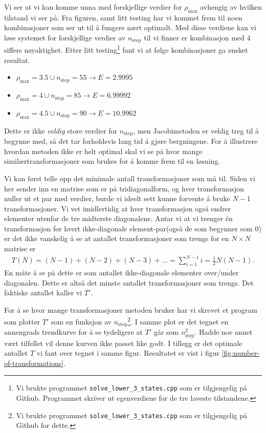 \documentclass[11pt]{article}
\begin{document}
Vi ser at vi kan komme unna med forskjellige verdier for
$\rho_\text{max}$ avhengig av hvilken tilstand vi ser på. Fra figuren,
samt litt testing har vi kommet frem til noen kombinasjoner som ser
ut til å fungere nært optimalt. Med disse verdiene kan vi løse
systemet for forskjellige verdier av $n_\text{step}$ til vi finner er kombinasjon med 4 siffers
nøyaktighet. Etter litt testing\footnote{Vi brukte programmet
  \texttt{solve\_lower\_3\_states.cpp} som er tilgjengelig på Github. Programmet skriver ut egenverdiene for de tre laveste
  tilstandene.} fant vi at følge kombinasjoner ga ønsket resultat. 
\begin{itemize}
  \item[] { $\rho_\text{max} = 3.5 \cup n_\text{step}=55\rightarrow E = 2.9995$}
  \item[] { $\rho_\text{max} = 4   \cup n_\text{step}=85\rightarrow E = 6.99992$}
  \item[] { $\rho_\text{max} = 4.5 \cup n_\text{step}=90\rightarrow E = 10.9962$}
\end{itemize}

Dette er ikke \emph{veldig} store verdier for $n_\text{step}$, men
Jacobimetoden er veldig treg til å begynne med, så det tar forholdsvis
lang tid å gjøre bergningene. For å illustrere hvordan metoden ikke er
helt optimal skal vi se på hvor mange similærtransformasjoner som
brukes for å komme frem til en løsning.

Vi kan først telle opp det minimale antall transformasjoner som må
til. Siden vi her sender inn en matrise som er på tridiagonalform, og
hver transformasjon nuller ut et par med verdier, burde vi ideelt sett kunne
forvente å bruke $N-1$ transformasjoner. Vi vet imidlertidig at hver 
transformasjon også endrer elementer utenfor de tre midterste diagonalene.
Antar vi at vi trenger én transformasjon for hvert ikke-diagonale element-par(også de som begynner som 0) er det ikke
vanskelig å se at antallet transformasjoner som trengs for en $N \times N$ 
matrise er
\begin{align*}
  T(N) = (N-1) + (N-2) + (N-3) + \dots = \sum_{i=1}^{N-1}i = \frac{ 1 }{ 2 }N(N-1).
\end{align*}
En måte å se på dette er som antallet ikke-diagonale elementer
over/under diagonalen. Dette er altså det minste antallet
transformasjoner som trengs. Det faktiske antallet kaller vi $T'$.

For å se hvor mange transformasjoner metoden bruker har vi skrevet et
program som plotter $T'$ som en funksjon av $n_\text{step}$\footnote{Vi brukte programmet
  \texttt{solve\_lower\_3\_states.cpp} som er tilgjengelig på Github for
  dette.}. I samme plot er det tegnet en annengrads trendkurve for å
se tydeligere at $T'$ går som $n_\text{step}^2$. Hadde noe annet
vært tilfellet vil denne kurven ikke passet like godt. I tillegg er
det optimale antallet $T$ vi fant over tegnet i samme figur. Resultatet er vist i
figur \ref{fig:number-of-transformations}. 
\end{document}
